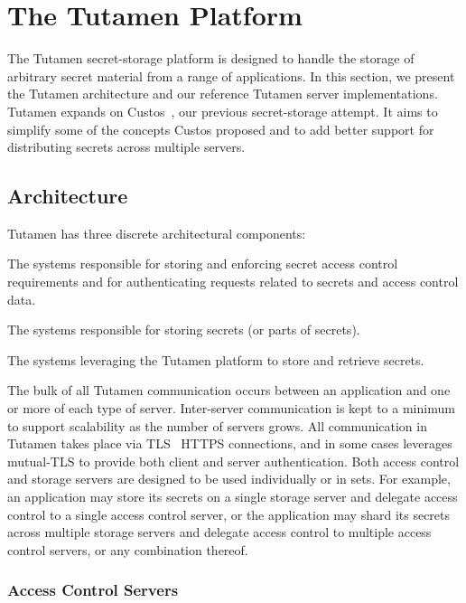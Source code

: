 \section{The Tutamen Platform}
\label{sec:tutamen}

The Tutamen secret-storage platform is designed to handle the storage
of arbitrary secret material from a range of applications. In this
section, we present the Tutamen architecture and our reference Tutamen
server implementations. Tutamen expands on Custos~\cite{custos-trios},
our previous secret-storage attempt. It aims to simplify some of the
concepts Custos proposed and to add better support for distributing
secrets across multiple servers.

\subsection{Architecture}
\label{sec:tutamen:arch}

Tutamen has three discrete architectural components:

\begin{packed_desc}
\item[Access Control Servers (ACS):] The systems responsible for
  storing and enforcing secret access control requirements and for
  authenticating requests related to secrets and access control data.
\item[Storage Servers (SS):] The systems responsible for storing
  secrets (or parts of secrets).
\item[Applications:] The systems leveraging the Tutamen platform to
  store and retrieve secrets.
\end{packed_desc}

The bulk of all Tutamen communication occurs between an application
and one or more of each type of server. Inter-server communication is
kept to a minimum to support scalability as the number of servers
grows. All communication in Tutamen takes place via
TLS~\cite{dierks2008} HTTPS connections, and in some cases leverages
mutual-TLS to provide both client and server authentication. Both
access control and storage servers are designed to be used
individually or in sets. For example, an application may store its
secrets on a single storage server and delegate access control to a
single access control server, or the application may shard its secrets
across multiple storage servers and delegate access control to
multiple access control servers, or any combination thereof.

\subsubsection{Access Control Servers}
\label{sec:tutamen:arch:acs}

